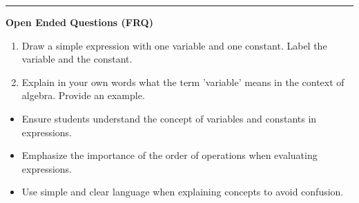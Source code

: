 \documentclass[10pt]{article}
\begin{document}
\vspace{-0.2cm}
\hrule
\vspace{0.2cm}
\textbf{\small Open Ended Questions (FRQ)}
\begin{enumerate}[label=\textbf{Q\arabic*.}, start=9, itemsep=5pt, topsep=0pt]

  \item \small Draw a simple expression with one variable and one constant. Label the variable and the constant. \vspace{1.2000000000000002cm}

  \item \small Explain in your own words what the term 'variable' means in the context of algebra. Provide an example. \vspace{1.2000000000000002cm}

\end{enumerate}

\vfill

\begin{tcolorbox}[colback=blue!5, colframe=mainblue!50, title=\small \textbf{Chef's Tips}, fonttitle=\bfseries, bottom=1mm]
\begin{itemize}[noitemsep, topsep=2pt, leftmargin=0.5cm]
  \item \scriptsize Ensure students understand the concept of variables and constants in expressions.\item \scriptsize Emphasize the importance of the order of operations when evaluating expressions.\item \scriptsize Use simple and clear language when explaining concepts to avoid confusion.
\end{itemize}
\end{tcolorbox}
\end{document}
